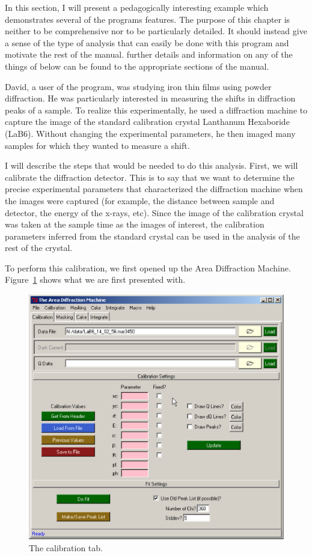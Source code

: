 In this section, I will present a pedagogically interesting 
example which demonstrates several of the programs features. 
The purpose of this chapter is neither to be comprehensive
nor to be particularly detailed. It should instead give a 
sense of the type of analysis that can easily be done with 
this program and motivate the rest of the manual. 
further details and information on any of 
the things of below can be found to the appropriate sections 
of the manual.

David, a user of the program, was studying iron thin films 
using powder diffraction. He was particularly interested in 
measuring the shifts in diffraction peaks of a sample. To 
realize this experimentally, he used a diffraction machine 
to capture the image of the standard calibration crystal 
Lanthanum Hexaboride (LaB6). Without changing the experimental 
parameters, he then imaged many samples for which they wanted 
to measure a shift.

I will describe the steps that would be needed to do this
analysis. First, we will calibrate the diffraction detector.
This is to say that we want to determine the precise 
experimental parameters that characterized the diffraction
machine when the images were captured (for example, the distance
between sample and detector, the energy of the x-rays, etc). Since 
the image of the calibration crystal was taken at the sample
time as the images of interest, the calibration parameters inferred
from the standard crystal can be used in the analysis of the
rest of the crystal.

To perform this calibration, we first opened up the Area 
Diffraction Machine. Figure~\ref{calibration_page_example} shows what we
are first presented with.

\begin{figure}[h]
    \centering
    \includegraphics[scale=.75]{figures/calibration_page.eps}
    \caption{The calibration tab.}
    \label{calibration_page_example}
\end{figure}

